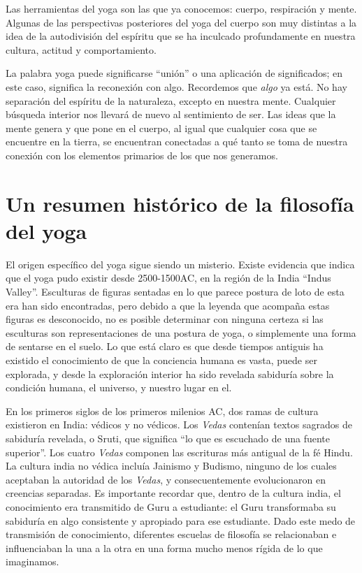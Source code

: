 Las herramientas del yoga son las que ya conocemos: cuerpo, respiración y mente. Algunas de las perspectivas posteriores del yoga del cuerpo son muy distintas a la idea de la autodivisión del espíritu que se ha inculcado profundamente en nuestra cultura, actitud y comportamiento.

La palabra yoga puede significarse ``unión'' o una aplicación de significados; en este caso, significa la reconexión con algo. Recordemos que \textit{algo} ya está. No hay separación del espíritu de la naturaleza, excepto en nuestra mente. Cualquier búsqueda interior nos llevará de nuevo al sentimiento de ser. Las ideas que la mente genera y que pone en el cuerpo, al igual que cualquier cosa que se encuentre en la tierra, se encuentran conectadas a qu\'e tanto se toma de nuestra conexión con los elementos primarios de los que nos generamos.

\section{Un resumen histórico de la filosofía del yoga}
El origen específico del yoga sigue siendo un misterio. Existe evidencia que indica que el yoga pudo existir desde 2500-1500AC, en la región de la India ``Indus Valley''. Esculturas de figuras sentadas en lo que parece postura de loto de esta era han sido encontradas, pero debido a que la leyenda que acompaña estas figuras es desconocido, no es posible determinar con ninguna certeza si las esculturas son representaciones de una postura de yoga, o simplemente una forma de sentarse en el suelo. Lo que está claro es que desde tiempos antiguis ha existido el conocimiento de que la conciencia humana es vasta, puede ser explorada, y desde la exploración interior ha sido revelada sabiduría sobre la condición humana, el universo, y nuestro lugar en el.

En los primeros siglos de los primeros milenios AC, dos ramas de cultura existieron en India: v\'edicos y no v\'edicos. Los \textit{Vedas} contenían textos sagrados de sabiduría revelada, o Sruti, que significa ``lo que es escuchado de una fuente superior''. Los cuatro \textit{Vedas} componen las escrituras más antigual de la f\'e Hindu. La cultura india no v\'edica incluía Jainismo y Budismo, ninguno de los cuales aceptaban la autoridad de los \textit{Vedas}, y consecuentemente evolucionaron en creencias separadas. Es importante recordar que, dentro de la cultura india, el conocimiento era transmitido de Guru a estudiante: el Guru transformaba su sabiduría en algo consistente y apropiado para ese estudiante. Dado este medo de transmisión de conocimiento, diferentes escuelas de filosofía se relacionaban e influenciaban la una a la otra en una forma mucho menos rígida de lo que imaginamos.

